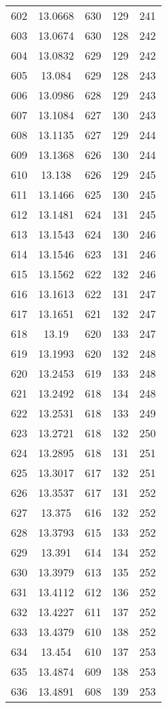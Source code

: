 \documentclass[12pt,a4paper]{article}
\begin{document}
\begin{tabular}{r|cccc}
	602 & 13.0668 & 630 & 129 & 241 \\
	603 & 13.0674 & 630 & 128 & 242 \\
	604 & 13.0832 & 629 & 129 & 242 \\
	605 & 13.084 & 629 & 128 & 243 \\
	606 & 13.0986 & 628 & 129 & 243 \\
	607 & 13.1084 & 627 & 130 & 243 \\
	608 & 13.1135 & 627 & 129 & 244 \\
	609 & 13.1368 & 626 & 130 & 244 \\
	610 & 13.138 & 626 & 129 & 245 \\
	611 & 13.1466 & 625 & 130 & 245 \\
	612 & 13.1481 & 624 & 131 & 245 \\
	613 & 13.1543 & 624 & 130 & 246 \\
	614 & 13.1546 & 623 & 131 & 246 \\
	615 & 13.1562 & 622 & 132 & 246 \\
	616 & 13.1613 & 622 & 131 & 247 \\
	617 & 13.1651 & 621 & 132 & 247 \\
	618 & 13.19 & 620 & 133 & 247 \\
	619 & 13.1993 & 620 & 132 & 248 \\
	620 & 13.2453 & 619 & 133 & 248 \\
	621 & 13.2492 & 618 & 134 & 248 \\
	622 & 13.2531 & 618 & 133 & 249 \\
	623 & 13.2721 & 618 & 132 & 250 \\
	624 & 13.2895 & 618 & 131 & 251 \\
	625 & 13.3017 & 617 & 132 & 251 \\
	626 & 13.3537 & 617 & 131 & 252 \\
	627 & 13.375 & 616 & 132 & 252 \\
	628 & 13.3793 & 615 & 133 & 252 \\
	629 & 13.391 & 614 & 134 & 252 \\
	630 & 13.3979 & 613 & 135 & 252 \\
	631 & 13.4112 & 612 & 136 & 252 \\
	632 & 13.4227 & 611 & 137 & 252 \\
	633 & 13.4379 & 610 & 138 & 252 \\
	634 & 13.454 & 610 & 137 & 253 \\
	635 & 13.4874 & 609 & 138 & 253 \\
	636 & 13.4891 & 608 & 139 & 253 \\

\end{tabular}
\end{document}
